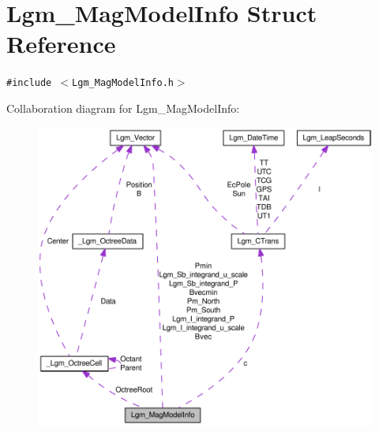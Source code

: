 \hypertarget{struct_lgm___mag_model_info}{
\section{Lgm\_\-MagModelInfo Struct Reference}
\label{struct_lgm___mag_model_info}
}
{\tt \#include $<$Lgm\_\-MagModelInfo.h$>$}

Collaboration diagram for Lgm\_\-MagModelInfo:\nopagebreak
\begin{figure}[H]
\begin{center}
\leavevmode
\includegraphics[width=400pt]{struct_lgm___mag_model_info__coll__graph}
\end{center}
\end{figure}
